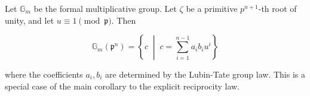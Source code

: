 Let $\mathbb{G}_m$ be the formal multiplicative group. Let $\zeta$ be a primitive $p^{n+1}$-th root of unity, and let $u \equiv 1 \pmod{\mathfrak{p}}$. Then

$$
\mathbb{G}_m(\mathfrak{p}^n) = \left\{ c \;\middle|\; c = \sum_{i=1}^{n-1} a_i b_i u^i \right\}
$$

where the coefficients $a_i, b_i$ are determined by the Lubin-Tate group law. This is a special case of the main corollary to the explicit reciprocity law.
